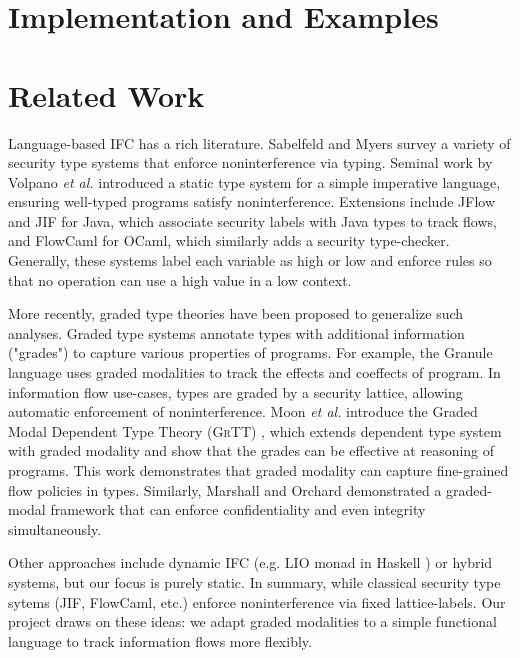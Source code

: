 \documentclass[conference]{IEEEtran}
\begin{document}
\section{Implementation and Examples}

\section{Related Work}

Language-based IFC has a rich literature. Sabelfeld and Myers \cite{sabelfeld2003language} survey a variety of security type systems that enforce noninterference via typing. Seminal work by Volpano \emph{et al.} \cite{volpano1996sound} introduced a static type system for a simple imperative language, ensuring well-typed programs satisfy noninterference. Extensions include JFlow \cite{myers1999jflow} and JIF \cite{pullicino2014jif} for Java, which associate security labels with Java types to track flows, and FlowCaml \cite{simonet2003flow} for OCaml, which similarly adds a security type-checker. Generally, these systems label each variable as high or low and enforce rules so that no operation can use a high value in a low context.

More recently, graded type theories have been proposed to generalize such analyses. Graded type systems annotate types with additional information ("grades") to capture various properties of programs. For example, the Granule language \cite{orchard2019quantitative} uses graded modalities to track the effects and coeffects of program. In information flow use-cases, types are graded by a security lattice, allowing automatic enforcement of noninterference. Moon \emph{et al.} introduce the Graded Modal Dependent Type Theory (\textsc{GrTT}) \cite{moon2021graded}, which extends dependent type system with graded modality and show that the grades can be effective at reasoning of programs. This work demonstrates that graded modality can capture fine-grained flow policies in types. Similarly, Marshall and Orchard  demonstrated a graded-modal framework that can enforce confidentiality and even integrity simultaneously.

Other approaches include dynamic IFC (e.g. LIO monad in Haskell \cite{stefan2011flexible}) or hybrid systems, but our focus is purely static. In summary, while classical security type sytems (JIF, FlowCaml, etc.) enforce noninterference via fixed lattice-labels. Our project draws on these ideas: we adapt graded modalities to a simple functional language to track information flows more flexibly.
\end{document}
